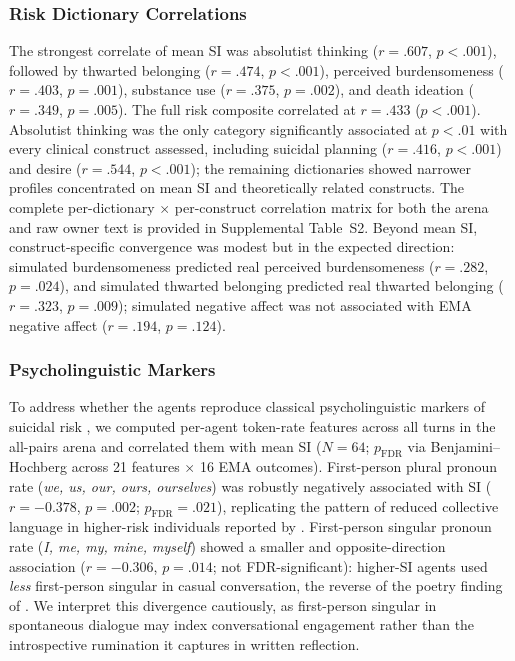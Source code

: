 \documentclass[review,12pt,authoryear]{elsarticle}
\begin{document}
\subsubsection{Risk Dictionary Correlations}

The strongest correlate of mean SI was absolutist thinking ($r = .607$, $p < .001$), followed by thwarted belonging ($r = .474$, $p < .001$), perceived burdensomeness ($r = .403$, $p = .001$), substance use ($r = .375$, $p = .002$), and death ideation ($r = .349$, $p = .005$). The full risk composite correlated at $r = .433$ ($p < .001$). Absolutist thinking was the only category significantly associated at $p < .01$ with every clinical construct assessed, including suicidal planning ($r = .416$, $p < .001$) and desire ($r = .544$, $p < .001$); the remaining dictionaries showed narrower profiles concentrated on mean SI and theoretically related constructs. The complete per-dictionary $\times$ per-construct correlation matrix for both the arena and raw owner text is provided in Supplemental Table~S2. Beyond mean SI, construct-specific convergence was modest but in the expected direction: simulated burdensomeness predicted real perceived burdensomeness ($r = .282$, $p = .024$), and simulated thwarted belonging predicted real thwarted belonging ($r = .323$, $p = .009$); simulated negative affect was not associated with EMA negative affect ($r = .194$, $p = .124$).

\subsubsection{Psycholinguistic Markers}

To address whether the agents reproduce classical psycholinguistic markers of suicidal risk \citep{stirman2001word}, we computed per-agent token-rate features across all turns in the all-pairs arena and correlated them with mean SI ($N = 64$; $p_{\text{FDR}}$ via Benjamini--Hochberg across 21 features $\times$ 16 EMA outcomes). First-person plural pronoun rate (\textit{we, us, our, ours, ourselves}) was robustly negatively associated with SI ($r = -0.378$, $p = .002$; $p_{\text{FDR}} = .021$), replicating the pattern of reduced collective language in higher-risk individuals reported by \citet{stirman2001word}. First-person singular pronoun rate (\textit{I, me, my, mine, myself}) showed a smaller and opposite-direction association ($r = -0.306$, $p = .014$; not FDR-significant): higher-SI agents used \textit{less} first-person singular in casual conversation, the reverse of the poetry finding of \citet{stirman2001word}. We interpret this divergence cautiously, as first-person singular in spontaneous dialogue may index conversational engagement rather than the introspective rumination it captures in written reflection.
\end{document}
